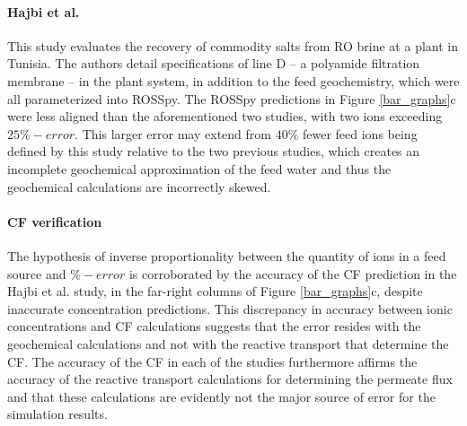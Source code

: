 \paragraph{Hajbi et al.\cite{Hajbi2010ReuseBrine}}
This study  evaluates the recovery of commodity salts from RO brine at a plant in Tunisia. The authors detail specifications of line D -- a polyamide filtration membrane -- in the plant system, in addition to the feed geochemistry, which were all parameterized into ROSSpy. The ROSSpy predictions in Figure \ref{bar_graphs}c were less aligned than the aforementioned two studies, with two ions exceeding $25\%-error$. This larger error may extend from $40\%$ fewer feed ions being defined by this study relative to the two previous studies, which creates an incomplete geochemical approximation of the feed water and thus the geochemical calculations are incorrectly skewed. 

\paragraph{CF verification}
The hypothesis of inverse proportionality between the quantity of ions in a feed source and $\%-error$ is corroborated by the accuracy of the CF prediction in the Hajbi et al. study, in the far-right columns of Figure \ref{bar_graphs}c, despite inaccurate concentration predictions. This discrepancy in accuracy between ionic concentrations and CF calculations suggests that the error resides with the geochemical calculations and not with the reactive transport that determine the CF. The accuracy of the CF in each of the studies furthermore affirms the accuracy of the reactive transport calculations for determining the permeate flux and that these calculations are evidently not the major source of error for the simulation results.


